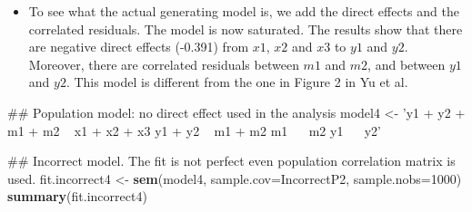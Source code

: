 \documentclass[]{article}
\newenvironment{Shaded}{\begin{snugshade}}{\end{snugshade}}
\newcommand{\KeywordTok}[1]{\textcolor[rgb]{0.13,0.29,0.53}{\textbf{#1}}}
\newcommand{\DataTypeTok}[1]{\textcolor[rgb]{0.13,0.29,0.53}{#1}}
\newcommand{\DecValTok}[1]{\textcolor[rgb]{0.00,0.00,0.81}{#1}}
\newcommand{\StringTok}[1]{\textcolor[rgb]{0.31,0.60,0.02}{#1}}
\newcommand{\NormalTok}[1]{#1}
\providecommand{\tightlist}{%
  \setlength{\itemsep}{0pt}\setlength{\parskip}{0pt}}
\begin{document}
\begin{itemize}
\tightlist
\item
  To see what the actual generating model is, we add the direct effects
  and the correlated residuals. The model is now saturated. The results
  show that there are negative direct effects (-0.391) from \(x1\),
  \(x2\) and \(x3\) to \(y1\) and \(y2\). Moreover, there are correlated
  residuals between \(m1\) and \(m2\), and between \(y1\) and \(y2\).
  This model is different from the one in Figure 2 in Yu et al.
\end{itemize}

\begin{Shaded}
\begin{Highlighting}[]
\NormalTok{## Population model: no direct effect used in the analysis}
\NormalTok{model4 <-}\StringTok{ 'y1 + y2 + m1 + m2 ~ x1 + x2 + x3}
\StringTok{           y1 + y2 ~ m1 + m2 }
\StringTok{           m1 ~~ m2}
\StringTok{           y1 ~~ y2'}

\NormalTok{## Incorrect model. The fit is not perfect even population correlation matrix is used.}
\NormalTok{fit.incorrect4 <-}\StringTok{ }\KeywordTok{sem}\NormalTok{(model4, }\DataTypeTok{sample.cov=}\NormalTok{IncorrectP2, }\DataTypeTok{sample.nobs=}\DecValTok{1000}\NormalTok{)}
\KeywordTok{summary}\NormalTok{(fit.incorrect4)}
\end{Highlighting}
\end{Shaded}
\end{document}
